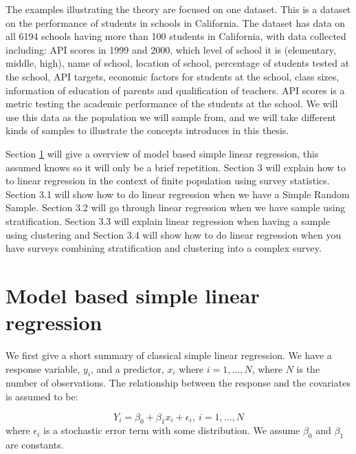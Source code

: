 \documentclass{article}
\begin{document}
The examples illustrating the theory are focused on one dataset. This is a dataset on the performance of students in schools in
California. The dataset has data on all 6194 schools having more than 100
students in California, with data collected
including: API scores in 1999 and 2000, which level of school it is
(elementary, middle, high), name of school, location of school, percentage of
students tested at the school, API targets, economic factors for students at the
school, class sizes, information of education of parents and qualification of teachers.
API scores is a metric testing the academic performance of the students at the school.
We will use this data as the population we will sample from, and we will take
different kinds of samples to illustrate the concepts introduces in this thesis.

Section \ref{sec:modLinReg} will give a overview of model based simple
linear regression, this assumed knows so it will only be a brief repetition.
Section 3 will explain how to to linear regression in the context of finite
population using survey statistics. Section 3.1 will show how to do linear
regression when we have a Simple Random Sample. Section 3.2 will go through
linear regression when we have sample using stratification. Section 3.3 will
explain linear regression when having a sample using clustering and Section 3.4
will show how to do linear regression when you have surveys combining
stratification and clustering into a complex survey.



\section{Model based simple linear regression} \label{sec:modLinReg}

We first give a short summary of classical simple linear regression. We have a response variable, \(y_i\), and a predictor,
\(x_i\) where \(i = 1, ..., N\), where \(N\) is the number of observations. The
relationship between the response and the covariates is assumed to be:

\begin{equation*}
Y_i = \beta_0 + \beta_1 x_i + \epsilon_i,\ i = 1, \dots, N
\end{equation*}
where \(\epsilon_i\) is a stochastic error term with some distribution. We
assume \(\beta_0\) and \(\beta_1\) are constants.
\end{document}
